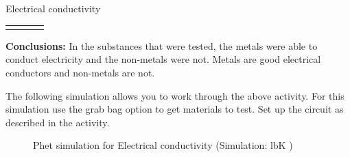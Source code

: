 \begin{iexperiment}{Electrical conductivity}
{\begin{table}[H]
\begin{center}
\begin{xtabular}[t]{|l|l|l|l|}
         &
         &
         &
     \tabularnewline{}
    \end{xtabular}
      \end{center}
\end{table}
    \par
  \par 
      \label{m38706*id66494}\noindent{}\textbf{Conclusions:}
        \newline
  In the substances that were tested, the metals were able to conduct electricity and the non-metals were not. Metals are good electrical conductors and non-metals are not.\par }
\label{m38706*eip-316}The following simulation allows you to work through the above activity. For this simulation use the grab bag option to get materials to test. Set up the circuit as described in the activity.
    \setcounter{subfigure}{0}
	\begin{figure}[H] %
    \textnormal{Phet simulation for Electrical conductivity}\vspace{.1in} \nopagebreak
  \label{m38806*phet!!!underscore!!!sim}\label{m38806*phet-simulation}
             { (Simulation:  lbK )}
      \vspace{2pt}
    \vspace{.1in}
 \end{figure}    
        \par 
    \label{m38706*cid7}

\end{iexperiment}
